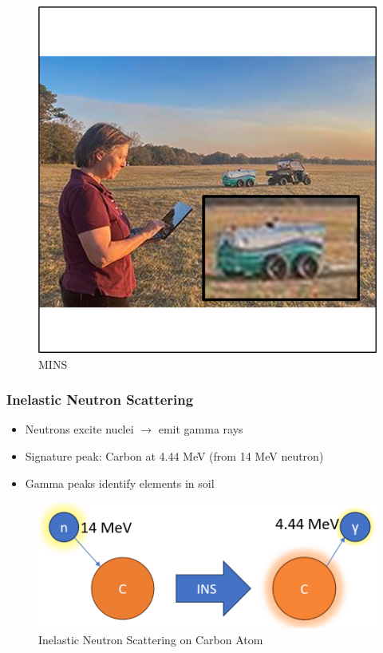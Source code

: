 \documentclass[xcolor=dvipsnames,envcountsect]{beamer}
\begin{document}
\begin{frame}
\begin{figure}
\begin{minipage}[b]{0.3\linewidth}
            \includegraphics[width=\linewidth]{Figures/MINSInField.png}
            \caption{MINS}
        \end{minipage}
        \label{fig:comparison}
    \end{figure}
\end{frame}

\begin{frame}
  \frametitle{Inelastic Neutron Scattering}
  \begin{itemize}
    \item Neutrons excite nuclei $\rightarrow$ emit gamma rays
    \item Signature peak: Carbon at 4.44 MeV (from 14 MeV neutron)
    \item Gamma peaks identify elements in soil
  \end{itemize}
  \begin{figure}
      \centering
      \includegraphics[width=\linewidth]{Figures/INS.png}
      \caption{Inelastic Neutron Scattering on Carbon Atom}
      \label{fig:InelasticNeutronScattering}
  \end{figure}
\end{frame}
\end{document}
